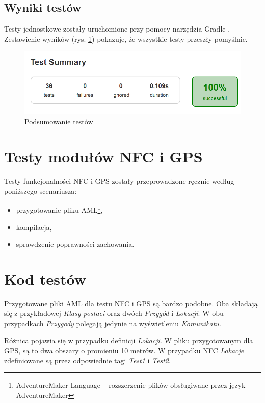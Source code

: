 \documentclass[openright]{xmgr}
\begin{document}
\subsection{Wyniki testów}
Testy jednostkowe zostały uruchomione przy pomocy narzędzia Gradle \cite{Gradle:2017:Doc}. Zestawienie wyników (rys. \ref{tests:results}) pokazuje, że wszystkie testy przeszły pomyślnie.

\begin{figure}[!tbh]
	\centering
	\includegraphics[width=1.0\hsize]{fig/test_summary}
	\caption{Podsumowanie testów}
	\label{tests:results}
\end{figure}

\section{Testy modułów NFC i GPS}

Testy funkcjonalności NFC i GPS zostały przeprowadzone ręcznie według poniższego scenariusza:

\begin{itemize}
  \item przygotowanie pliku AML\footnote{AdventureMaker Language -- rozszerzenie plików obsługiwane przez język AdventureMaker},
  \item kompilacja,
  \item sprawdzenie poprawności zachowania.
\end{itemize}

\section{Kod testów}

Przygotowane pliki AML dla testu NFC i GPS są bardzo podobne. Oba składają się z przykładowej \textit{Klasy postaci} oraz dwóch \textit{Przygód} i \textit{Lokacji}. W obu przypadkach \textit{Przygody} polegają jedynie na wyświetleniu \textit{Komunikatu}. 

Różnica pojawia się w przypadku definicji \textit{Lokacji}. W pliku przygotowanym dla GPS, są to dwa obszary o promieniu 10 metrów. W przypadku NFC \textit{Lokacje} zdefiniowane są przez odpowiednie tagi \textit{Test1} i \textit{Test2}.
\end{document}
